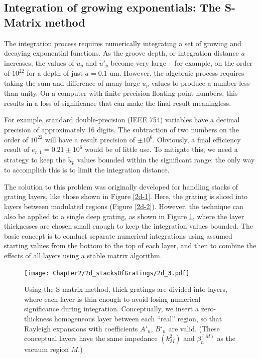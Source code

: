 \subsection{Integration of growing exponentials: The S-Matrix method}
\label{SMatrixMethod}
The integration process  requires numerically integrating a set of growing and decaying exponential functions.  As the groove depth, or integration distance $a$ increases, the values of $\tilde u_p$ and $\tilde u'_p$ become very large -- for example, on the order of $10^{22}$ for a depth of just $a = 0.1$ um.  However, the algebraic process  requires taking the sum and difference of many large $\tilde u_p$ values to produce a number less than unity.  On a computer with finite-precision floating point numbers, this results in a loss of significance that can make the final result meaningless.

For example, standard double-precision (IEEE 754) variables have a decimal precision of approximately 16 digits.  The subtraction of two numbers on the order of $10^{22}$ will have a result precision of $\pm10^6$.  Obviously, a final efficiency result of $e_{r,1} = 0.21 \pm 10^6$ would be of little use.  To mitigate this, we need a strategy to keep the $\tilde u_p$ values bounded within the significant range; the only way to accomplish this is to limit the integration distance.

The solution to this problem was originally developed for handling stacks of grating layers, like those shown in Figure \ref{2d-1}.  Here, the grating is sliced into layers between modulated regions (Figure \ref{2d-2}).  However, the technique can also be applied to a single deep grating, as shown in Figure \ref{2d-3}, where the layer thicknesses are chosen small enough to keep the integration values bounded.  The basic concept is to conduct separate numerical integrations using assumed starting values from the bottom to the top of each layer, and then to combine the effects of all layers using a stable matrix algorithm.

\begin{figure}[htbp] %
   \centering
   \texttt{[image: Chapter2/2d\_stacksOfGratings/2d\_3.pdf]} 
   \caption[Using the S-matrix method, thick gratings are divided into layers, where each layer is thin enough to avoid losing numerical significance during integration.]{Using the S-matrix method, thick gratings are divided into layers, where each layer is thin enough to avoid losing numerical significance during integration.  Conceptually, we insert a zero-thickness homogeneous layer between each ``real'' region, so that Rayleigh expansions with coefficients $A'_n,\, B'_n$ are valid.  (These conceptual layers have the same impedance $(k_M^2)$ and $\beta_n^{(M)}$ as the vacuum region $M$.)}
   \label{2d-3}
\end{figure}


